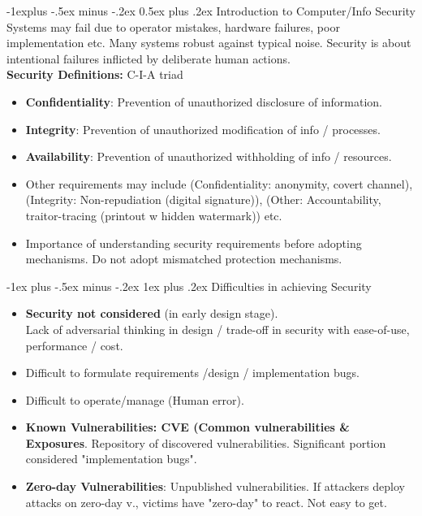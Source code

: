 \documentclass[10pt, landscape]{article}
\makeatletter
\renewcommand{\subsection}{\@startsection{subsection}{2}{0mm}%
                                {-1explus -.5ex minus -.2ex}%
                                {0.5ex plus .2ex}%
                                {\normalfont\normalsize\bfseries}}
\renewcommand{\subsubsection}{\@startsection{subsubsection}{3}{0mm}%
                                {-1ex plus -.5ex minus -.2ex}%
                                {1ex plus .2ex}%
                                {\normalfont\small\bfseries}}
\makeatother
\begin{document}
\begin{multicols*}{3}
\subsection{Introduction to Computer/Info Security}
Systems may fail due to operator mistakes, hardware failures, poor implementation etc. Many systems robust against typical noise. Security is about intentional failures inflicted by deliberate human actions. \\
\textbf{Security Definitions:} C-I-A triad
\begin{itemize}
\item \textbf{Confidentiality}: Prevention of unauthorized disclosure of information.
\item \textbf{Integrity}: Prevention of unauthorized modification of info / processes.
\item \textbf{Availability}: Prevention of unauthorized withholding of info / resources.
\item Other requirements may include (Confidentiality: anonymity, covert channel), (Integrity: Non-repudiation (digital signature)), (Other: Accountability, traitor-tracing (printout w hidden watermark)) etc.
\item Importance of understanding security requirements before adopting mechanisms. Do not adopt mismatched protection mechanisms.
\end{itemize}

\subsubsection{Difficulties in achieving Security}
\begin{itemize}
\item \textbf{Security not considered} (in early design stage). \\
Lack of adversarial thinking in design / trade-off in security with ease-of-use, performance / cost.
\item Difficult to formulate requirements /design / implementation bugs. 
\item Difficult to operate/manage (Human error). \\
\item \textbf{Known Vulnerabilities: CVE (Common vulnerabilities \& Exposures}. Repository of discovered vulnerabilities. Significant portion considered "implementation bugs".
\item \textbf{Zero-day Vulnerabilities}: Unpublished vulnerabilities. If attackers deploy attacks on zero-day v., victims have "zero-day" to react. Not easy to get.
\end{itemize} 



\end{multicols*}
\end{document}
